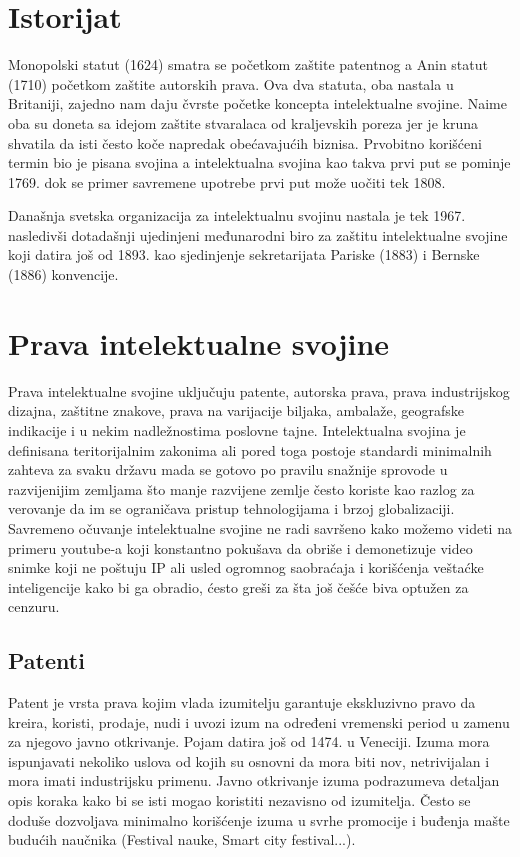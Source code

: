 \documentclass[a4paper]{article}
\begin{document}
\section{Istorijat}
Monopolski statut (1624) smatra se početkom zaštite patentnog a Anin statut (1710) početkom zaštite autorskih prava. Ova dva statuta, oba nastala u Britaniji, zajedno nam daju čvrste početke koncepta intelektualne svojine. Naime oba su doneta sa idejom zaštite stvaralaca od kraljevskih poreza jer je kruna shvatila da isti često koče napredak obećavajućih biznisa. Prvobitno korišćeni termin bio je pisana svojina a intelektualna svojina kao takva prvi put se pominje 1769. dok se primer savremene upotrebe prvi put može uočiti tek 1808. 

Današnja svetska organizacija za intelektualnu svojinu nastala je tek 1967. nasledivši dotadašnji ujedinjeni međunarodni biro za zaštitu intelektualne svojine koji datira još od 1893. kao sjedinjenje sekretarijata Pariske (1883) i Bernske (1886) konvencije.

\section{Prava intelektualne svojine}	
\label{sec:prava_int_svoj}

Prava intelektualne svojine uključuju patente, autorska prava, prava industrijskog dizajna, zaštitne znakove, prava na varijacije biljaka, ambalaže, geografske indikacije i u nekim nadležnostima poslovne tajne. Intelektualna svojina je definisana
teritorijalnim zakonima ali pored toga postoje standardi minimalnih zahteva za
svaku državu mada se gotovo po pravilu snažnije sprovode u razvijenijim
zemljama što manje razvijene zemlje često koriste kao razlog za verovanje da im
se ograničava pristup tehnologijama i brzoj globalizaciji. Savremeno očuvanje
intelektualne svojine ne radi savršeno kako možemo videti na primeru youtube-a
koji konstantno pokušava da obriše i demonetizuje video snimke koji ne poštuju
IP ali usled ogromnog saobraćaja i korišćenja veštaćke inteligencije kako bi ga obradio, ćesto greši za šta još češće biva optužen za cenzuru.

\subsection{Patenti}
\label{subsec:patenti}

Patent je vrsta prava kojim vlada izumitelju garantuje ekskluzivno pravo da kreira, koristi, prodaje, nudi i uvozi izum na određeni vremenski period u zamenu za njegovo javno otkrivanje. Pojam datira još od 1474. u Veneciji. Izuma mora ispunjavati nekoliko uslova od kojih su osnovni da mora biti nov, netrivijalan i mora imati industrijsku primenu. Javno otkrivanje izuma podrazumeva detaljan opis koraka kako bi se isti mogao koristiti nezavisno od izumitelja. Često se doduše dozvoljava minimalno korišćenje izuma u svrhe promocije i buđenja mašte budućih naučnika (Festival nauke, Smart city festival...).
\end{document}
